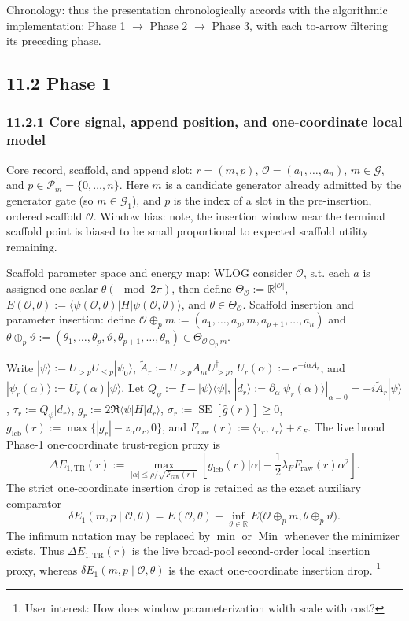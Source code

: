 \documentclass[11pt]{article}
\begin{document}
Chronology: thus the presentation chronologically accords with the algorithmic implementation: Phase 1 \(\to\) Phase 2 \(\to\) Phase 3, with each to-arrow filtering its preceding phase.

\subsection*{11.2 Phase 1}

\subsubsection*{11.2.1 Core signal, append position, and one-coordinate local model}
Core record, scaffold, and append slot: $r=(m,p)$, $\mathcal O=(a_1,\dots,a_n)$, $m\in\mathcal G$, and $p\in\mathcal P_m^{1}=\{0,\dots,n\}$. Here $m$ is a candidate generator already admitted by the generator gate (so $m\in\mathcal G_1$), and $p$ is the index of a slot in the pre-insertion, ordered scaffold $\mathcal O$. Window bias: note, the insertion window near the terminal scaffold point is biased to be small proportional to expected scaffold utility remaining.

Scaffold parameter space and energy map: WLOG consider $\mathcal O$, s.t. each $a$ is assigned one scalar $\theta (\mod 2 \pi)$, then define $\Theta_{\mathcal O}:=\mathbb R^{|\mathcal O|}$, $E(\mathcal O,\theta):=\langle\psi(\mathcal O,\theta)|H|\psi(\mathcal O,\theta)\rangle$, and $\theta\in\Theta_{\mathcal O}$. Scaffold insertion and parameter insertion: define $\mathcal O\oplus_p m:=(a_1,\dots,a_p,m,a_{p+1},\dots,a_n)$ and $\theta\oplus_p\vartheta:=(\theta_1,\dots,\theta_p,\vartheta,\theta_{p+1},\dots,\theta_n)\in\Theta_{\mathcal O\oplus_p m}$.

Write $|\psi\rangle:=U_{>p}U_{\le p}|\psi_0\rangle$, $\widetilde A_r:=U_{>p}A_mU_{>p}^\dagger$, $U_r(\alpha):=e^{-i\alpha \widetilde A_r}$, and $|\psi_r(\alpha)\rangle:=U_r(\alpha)|\psi\rangle$. Let $Q_\psi:=I-|\psi\rangle\langle\psi|$, $|d_r\rangle:=\left.\partial_\alpha|\psi_r(\alpha)\rangle\right|_{\alpha=0}=-i\widetilde A_r|\psi\rangle$, $\tau_r:=Q_\psi|d_r\rangle$, $g_r:=2\Re\langle \psi|H|d_r\rangle$, $\sigma_r:=\operatorname{SE}\!\left[\widehat g(r)\right]\ge 0$, $g_{\mathrm{lcb}}(r):=\max\{|g_r|-z_\alpha\sigma_r,0\}$, and $F_{\mathrm{raw}}(r):=\langle \tau_r,\tau_r\rangle+\varepsilon_F$. The live broad Phase-1 one-coordinate trust-region proxy is
\[
\Delta E_{1,\mathrm{TR}}(r)
:=
\max_{|\alpha|\le \rho/\sqrt{F_{\mathrm{raw}}(r)}}
\left[
g_{\mathrm{lcb}}(r)|\alpha|
-\frac12 \lambda_F F_{\mathrm{raw}}(r)\alpha^2
\right].
\]
The strict one-coordinate insertion drop is retained as the exact auxiliary comparator
\[
\delta E_1(m,p\mid\mathcal O,\theta)
=
E(\mathcal O,\theta)
-\inf_{\vartheta\in\mathbb R}E\bigl(\mathcal O\oplus_p m,\theta\oplus_p\vartheta\bigr).
\]
The infimum notation may be replaced by $\min$ or $\operatorname{Min}$ whenever the minimizer exists. Thus $\Delta E_{1,\mathrm{TR}}(r)$ is the live broad-pool second-order local insertion proxy, whereas $\delta E_1(m,p\mid\mathcal O,\theta)$ is the exact one-coordinate insertion drop. \footnote{User interest: How does window parameterization width scale with cost?}
\end{document}
